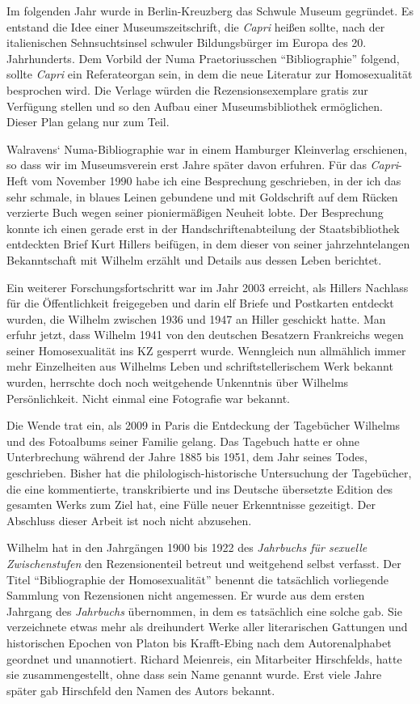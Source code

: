 \documentclass[a4paper,
fontsize=11pt,
oneside,
numbers=noperiodatend,
parskip=half-,
bibliography=totoc,
final
]{scrartcl}
\begin{document}
Im folgenden Jahr wurde in Berlin-Kreuzberg das Schwule Museum
gegründet. Es entstand die Idee einer Museumszeitschrift, die
\emph{Capri} heißen sollte, nach der italienischen Sehnsuchtsinsel
schwuler Bildungsbürger im Europa des 20. Jahrhunderts. Dem Vorbild der
Numa Praetoriusschen \enquote{Bibliographie} folgend, sollte
\emph{Capri} ein Referateorgan sein, in dem die neue Literatur zur
Homosexualität besprochen wird. Die Verlage würden die
Rezensionsexemplare gratis zur Verfügung stellen und so den Aufbau einer
Museumsbibliothek ermöglichen. Dieser Plan gelang nur zum Teil.

Walravens` Numa-Bibliographie war in einem Hamburger Kleinverlag
erschienen, so dass wir im Museumsverein erst Jahre später davon
erfuhren. Für das \emph{Capri}-Heft vom November 1990 habe ich eine
Besprechung geschrieben, in der ich das sehr schmale, in blaues Leinen
gebundene und mit Goldschrift auf dem Rücken verzierte Buch wegen seiner
pioniermäßigen Neuheit lobte. Der Besprechung konnte ich einen gerade
erst in der Handschriftenabteilung der Staatsbibliothek entdeckten Brief
Kurt Hillers beifügen, in dem dieser von seiner jahrzehntelangen
Bekanntschaft mit Wilhelm erzählt und Details aus dessen Leben
berichtet.

Ein weiterer Forschungsfortschritt war im Jahr 2003 erreicht, als
Hillers Nachlass für die Öffentlichkeit freigegeben und darin elf Briefe
und Postkarten entdeckt wurden, die Wilhelm zwischen 1936 und 1947 an
Hiller geschickt hatte. Man erfuhr jetzt, dass Wilhelm 1941 von den
deutschen Besatzern Frankreichs wegen seiner Homosexualität ins KZ
gesperrt wurde. Wenngleich nun allmählich immer mehr Einzelheiten aus
Wilhelms Leben und schriftstellerischem Werk bekannt wurden, herrschte
doch noch weitgehende Unkenntnis über Wilhelms Persönlichkeit. Nicht
einmal eine Fotografie war bekannt.

Die Wende trat ein, als 2009 in Paris die Entdeckung der Tagebücher
Wilhelms und des Fotoalbums seiner Familie gelang. Das Tagebuch hatte er
ohne Unterbrechung während der Jahre 1885 bis 1951, dem Jahr seines
Todes, geschrieben. Bisher hat die philologisch-historische Untersuchung
der Tagebücher, die eine kommentierte, transkribierte und ins Deutsche
übersetzte Edition des gesamten Werks zum Ziel hat, eine Fülle neuer
Erkenntnisse gezeitigt. Der Abschluss dieser Arbeit ist noch nicht
abzusehen.

Wilhelm hat in den Jahrgängen 1900 bis 1922 des \emph{Jahrbuchs für
sexuelle Zwischenstufen} den Rezensionenteil betreut und weitgehend
selbst verfasst. Der Titel \enquote{Bibliographie der Homosexualität}
benennt die tatsächlich vorliegende Sammlung von Rezensionen nicht
angemessen. Er wurde aus dem ersten Jahrgang des \emph{Jahrbuchs}
übernommen, in dem es tatsächlich eine solche gab. Sie verzeichnete
etwas mehr als dreihundert Werke aller literarischen Gattungen und
historischen Epochen von Platon bis Krafft-Ebing nach dem
Autorenalphabet geordnet und unannotiert. Richard Meienreis, ein
Mitarbeiter Hirschfelds, hatte sie zusammengestellt, ohne dass sein Name
genannt wurde. Erst viele Jahre später gab Hirschfeld den Namen des
Autors bekannt.
\end{document}
